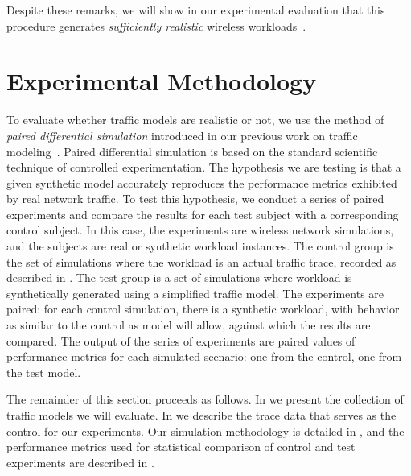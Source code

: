 \documentclass[twocolumn,final]{svjour3}
\begin{document}
Despite these remarks, we will show in our experimental evaluation that this procedure generates \emph{sufficiently realistic} wireless workloads~\cite{Karpinski07:realism,Karpinski07:cbr-failure}.



\section{Experimental Methodology}
\label{sec:methodology}

To evaluate whether traffic models are realistic or not, we use the method of \textit{paired differential simulation} introduced in our previous work on traffic modeling~\cite{Karpinski07:realism,Karpinski07:cbr-failure}. %
%
%
Paired differential simulation is based on the standard scientific technique of controlled experimentation. 
The hypothesis we are testing is that a given synthetic model accurately reproduces the performance metrics exhibited by real network traffic. To test this hypothesis, we conduct a series of paired experiments and compare the results for each test subject with a corresponding control subject. In this case, the experiments are wireless network simulations, and the subjects are real or synthetic workload instances. The control group is the set of simulations where the workload is an actual traffic trace, recorded as described in . The test group is a set of simulations where workload is synthetically generated using a simplified traffic model. The experiments are paired: for each control simulation, there is a synthetic workload, with behavior as similar to the control as model will allow, against which the results are compared. The output of the series of experiments are paired values of performance metrics for each simulated scenario: one from the control, one from the test model.

The remainder of this section proceeds as follows. In  we present the collection of traffic models we will evaluate. In  we describe the trace data that serves as the control for our experiments. Our simulation methodology is detailed in , and the performance metrics used for statistical comparison of control and test experiments are described in .
\end{document}
